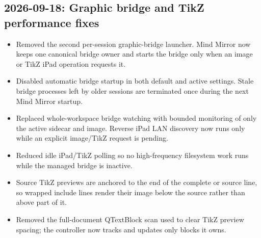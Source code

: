 \documentclass[a4paper]{article}
\title{}
\date{}
\author{Mohammad Rahmani}
\begin{document}
   \maketitle

   \begin{preview}
      \section*{2026-09-18: Graphic bridge and TikZ performance fixes}
      \begin{itemize}
         \item Removed the second per-session graphic-bridge launcher. Mind Mirror now keeps one canonical bridge owner and starts the bridge only when an image or TikZ iPad operation requests it.
         \item Disabled automatic bridge startup in both default and active settings. Stale bridge processes left by older sessions are terminated once during the next Mind Mirror startup.
         \item Replaced whole-workspace bridge watching with bounded monitoring of only the active sidecar and image. Reverse iPad LAN discovery now runs only while an explicit image/TikZ request is pending.
         \item Reduced idle iPad/TikZ polling so no high-frequency filesystem work runs while the managed bridge is inactive.
         \item Source TikZ previews are anchored to the end of the complete \verb|| or \verb|| source line, so wrapped include lines render their image below the source rather than above part of it.
         \item Removed the full-document QTextBlock scan used to clear TikZ preview spacing; the controller now tracks and updates only blocks it owns.
      \end{itemize}
   \end{preview}

   
   
\end{document}
